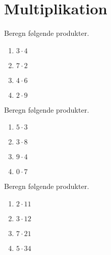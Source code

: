 \documentclass[../main.tex]{subfiles}
\begin{document}
\section{Multiplikation}
\begin{prob}
    Beregn følgende produkter.
    \begin{enumerate}[label=\alph*)]
        \item \(\displaystyle 3 \cdot 4\)
        \vspace{3mm}
        \item \(\displaystyle 7 \cdot 2\)
        \vspace{3mm}
        \item \(\displaystyle 4 \cdot 6\)
        \vspace{3mm}
        \item \(\displaystyle 2 \cdot 9\)
    \end{enumerate}
\end{prob}

\begin{prob}
    Beregn følgende produkter.
    \begin{enumerate}[label=\alph*)]
        \item \(\displaystyle 5 \cdot 3\)
        \vspace{3mm}
        \item \(\displaystyle 3 \cdot 8\)
        \vspace{3mm}
        \item \(\displaystyle 9 \cdot 4\)
        \vspace{3mm}
        \item \(\displaystyle 0 \cdot 7\)
    \end{enumerate}
\end{prob}

\begin{prob}
    Beregn følgende produkter.
    \begin{enumerate}[label=\alph*)]
        \item \(\displaystyle 2 \cdot 11\)
        \vspace{3mm}
        \item \(\displaystyle 3 \cdot 12\)
        \vspace{3mm}
        \item \(\displaystyle 7 \cdot 21\)
        \vspace{3mm}
        \item \(\displaystyle 5 \cdot 34\)
    \end{enumerate}
\end{prob}
\end{document}

